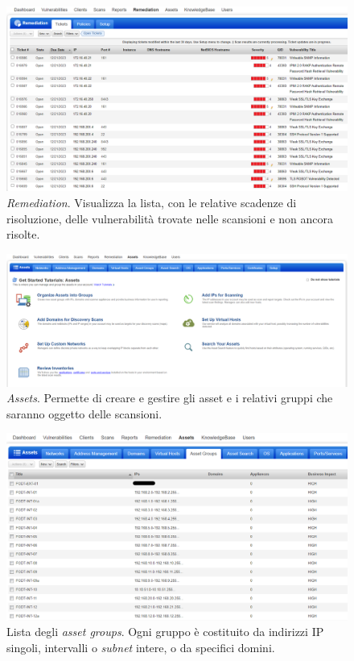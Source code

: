 \documentclass[target=bach,aauheader=]{thud}
\begin{document}
\begin{figure}[!]
\centering
\includegraphics[scale=0.425]{images/qualys_remediation.png}
    \caption{\textit{Remediation}. Visualizza la lista, con le relative scadenze di risoluzione, delle vulnerabilità trovate nelle scansioni e non ancora risolte.}
\end{figure}

\begin{figure}[h]
\centering
\includegraphics[scale=0.329]{images/qualys_assets.png}
    \caption{\textit{Assets}. Permette di creare e gestire gli asset e i relativi gruppi che saranno oggetto delle scansioni.}
\end{figure}

\begin{figure}[!]
    \centering
    \includegraphics[width=1\linewidth]{images/qualys_targets.png}
    \caption{Lista degli \textit{asset groups}. Ogni gruppo è costituito da indirizzi IP singoli, intervalli o \textit{subnet} intere, o da specifici domini.}
    \label{fig:qualys_targets}
\end{figure}
\end{document}
